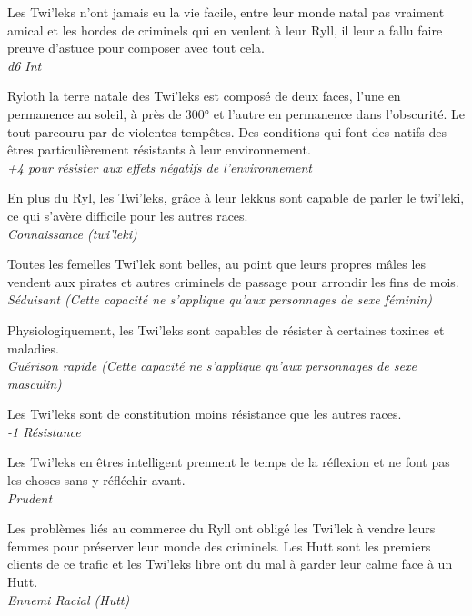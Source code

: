 \begin{description}[align=left]
\item [Rusé \& Astucieux] 			%
		Les Twi’leks n’ont jamais eu la vie facile, entre leur monde natal pas vraiment amical et les hordes de criminels qui en veulent à leur Ryll, il leur a fallu faire preuve d’astuce pour composer avec tout cela.\\
		\textit{d6 Int}

\item [Ni chaud ni froid] 			%
		Ryloth la terre natale des Twi’leks est composé de deux faces, l’une en permanence au soleil, à près de 300° et l’autre en permanence dans l’obscurité. Le tout parcouru par de violentes tempêtes. Des conditions qui font des natifs des êtres particulièrement résistants à leur environnement.\\
		\textit{+4 pour résister aux effets négatifs de l’environnement}

\item [Lekkus Speaking] 			%
		En plus du Ryl, les Twi’leks, grâce à leur lekkus sont capable de parler le twi’leki, ce qui s’avère difficile pour les autres races.\\
		\textit{Connaissance (twi’leki)}

\item [Belle plante (Femelles)] 	%
		Toutes les femelles Twi’lek sont belles, au point que leurs propres mâles les vendent aux pirates et autres criminels de passage pour arrondir les fins de mois.\\
		\textit{Séduisant (Cette capacité ne s’applique qu’aux personnages de sexe féminin)}

\item [Immunisé (Mâles)] 			%
		Physiologiquement, les Twi’leks sont capables de résister à certaines toxines et maladies.\\
		\textit{Guérison rapide (Cette capacité ne s’applique qu’aux personnages de sexe masculin)}

\item [Frêles] 						%
		Les Twi’leks sont de constitution moins résistance que les autres races.\\
		\textit{-1 Résistance}

\item [Prudent] 					%
		Les Twi’leks en êtres intelligent prennent le temps de la réflexion et ne font pas les choses sans y réfléchir avant.\\
		\textit{Prudent}

\item [Hutt(er)] 					%
		Les problèmes liés au commerce du Ryll ont obligé les Twi’lek à vendre leurs femmes pour préserver leur monde des criminels. Les Hutt sont les premiers clients de ce trafic et les Twi’leks libre ont du mal à garder leur calme face à un Hutt.\\
		\textit{Ennemi Racial (Hutt)}
\end{description}